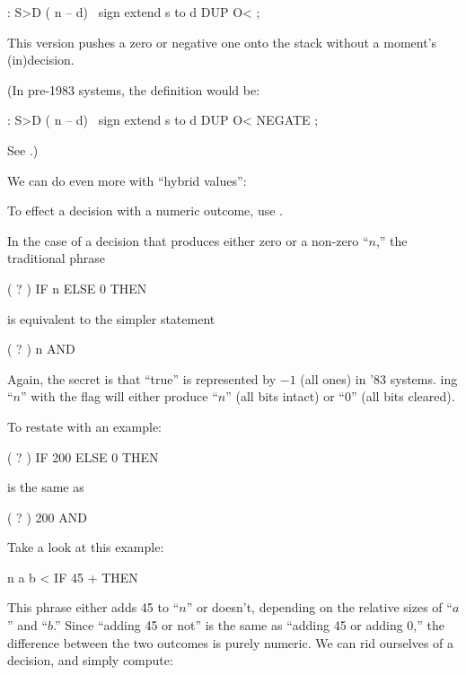 \begin{Code}
: S>D  ( n -- d)  \ sign extend s to d
     DUP  O< ;
\end{Code}
This version pushes a zero or negative one onto the stack without a
moment's (in)decision.

\medbreak
(In pre-1983 systems, the definition would be:

\begin{Code}
: S>D  ( n -- d)  \ sign extend s to d
     DUP  O< NEGATE ;
\end{Code}
See .)%
\medbreak

%
We can do even more with ``hybrid values'':
%
\begin{tip}
To effect a decision with a numeric outcome, use .
\end{tip}
In the case of a decision that produces either zero or a non-zero ``$n$,''
the traditional phrase

\begin{Code}
( ? ) IF  n  ELSE  0  THEN
\end{Code}
is equivalent to the simpler statement

\begin{Code}
( ? )  n AND
\end{Code}
Again, the secret is that ``true'' is represented by $-1$ (all ones) in
'83 \Forth{} systems. ing ``$n$'' with the flag will either
produce ``$n$'' (all bits intact) or ``$0$'' (all bits cleared).

To restate with an example:

\begin{Code}
( ? )  IF  200  ELSE  0  THEN
\end{Code}
is the same as

\begin{Code}
( ? )  200 AND
\end{Code}
Take a look at this example:

\begin{Code}
n  a b <  IF  45 +  THEN
\end{Code}
This phrase either adds 45 to ``$n$'' or doesn't, depending on the
relative sizes of ``$a$'' and ``$b$.'' Since ``adding 45 or not'' is the
same as ``adding 45 or adding 0,'' the difference between the two outcomes
is purely numeric.  We can rid ourselves of a decision, and simply
compute:

